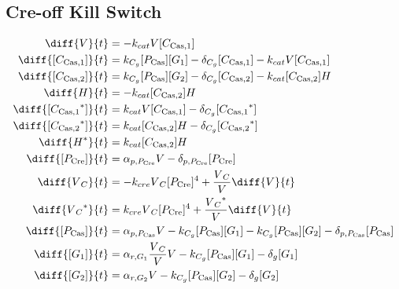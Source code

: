 \subsection{Cre-off Kill Switch}
\label{s:Cre_off_Kill_Switch}

\begin{align}
\diff{\vectorGen{}}{t} & = - \casCutRate{{}}\vectorGen{}\conc{\cplx{\cas}{1}}\\
\diff{\conc{\cplx{\cas}{1}}}{t} & =  \gRnaBind{}\conc{\proSp{\cas{}}}\conc{\gRna{1}} - \casCompDegradeRate{}\conc{\cplx{\cas}{1}} - \casCutRate{{}}\vectorGen{}\conc{\cplx{\cas}{1}}\\
\diff{\conc{\cplx{\cas}{2}}}{t} & =  \gRnaBind{}\conc{\proSp{\cas{}}}\conc{\gRna{2}} - \casCompDegradeRate{}\conc{\cplx{\cas}{2}} - \casCutRate{{}}\conc{\cplx{\cas}{2}}\hostGen{}\\
\diff{\hostGen{}}{t} & = - \casCutRate{{}}\conc{\cplx{\cas}{2}}\hostGen{}\\
\diff{\conc{\bound{\cplx{\cas}{1}}}}{t} & =  \casCutRate{{}}\vectorGen{}\conc{\cplx{\cas}{1}} - \casCompDegradeRate{}\conc{\bound{\cplx{\cas}{1}}}\\
\diff{\conc{\bound{\cplx{\cas}{2}}}}{t} & =  \casCutRate{{}}\conc{\cplx{\cas}{2}}\hostGen{} - \casCompDegradeRate{}\conc{\bound{\cplx{\cas}{2}}}\\
\diff{\edited{\hostGen{}}}{t} & =  \casCutRate{{}}\conc{\cplx{\cas}{2}}\hostGen{}\\
\diff{\conc{\proSp{\cre{}}}}{t} & =  \txtlRate{\proSp{\cre{}}}\vectorGen{} - \proDegradeRate{\proSp{\cre{}}}\conc{\proSp{\cre{}}}\\
\diff{\vectorGen{}_C}{t} & = - \creCutRate{} \vectorGen{}_C \conc{\proSp{\cre{}}}^4 + \frac{\vectorGen{}_C}{\vectorGen{}} \diff{\vectorGen{}}{t}\\
\diff{\edited{\vectorGen{}_C}}{t} & =  \creCutRate{} \vectorGen{}_C \conc{\proSp{\cre{}}}^4 + \frac{\edited{\vectorGen{}_C}}{\vectorGen{}} \diff{\vectorGen{}}{t}\\
\diff{\conc{\proSp{\cas{}}}}{t} & =  \txtlRate{\proSp{\cas{}}}\vectorGen{} - \gRnaBind{}\conc{\proSp{\cas{}}}\conc{\gRna{1}} - \gRnaBind{}\conc{\proSp{\cas{}}}\conc{\gRna{2}} - \proDegradeRate{\proSp{\cas{}}}\conc{\proSp{\cas{}}}\\
\diff{\conc{\gRna{1}}}{t} & =  \txRate{\gRna{1}}\frac{\vectorGen{}_C}{\vectorGen{}}\vectorGen{} - \gRnaBind{}\conc{\proSp{\cas{}}}\conc{\gRna{1}} - \rnaDegradeRate{}\conc{\gRna{1}}\\
\diff{\conc{\gRna{2}}}{t} & =  \txRate{\gRna{2}}\vectorGen{} - \gRnaBind{}\conc{\proSp{\cas{}}}\conc{\gRna{2}} - \rnaDegradeRate{}\conc{\gRna{2}}
\end{align}

